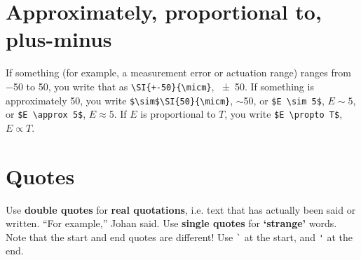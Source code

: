 \documentclass[fleqn, 12pt]{iopart-mod}
\begin{document}
\section{Approximately, proportional to, plus-minus}
If something (for example, a measurement error or actuation range) ranges from \SI{-50}{\micm} to \SI{+50}{\micm}, you write that as \verb|\SI{+-50}{\micm}|, \SI{+-50}{\micm}. If something is approximately \SI{50}{\micm}, you write \verb|$\sim$\SI{50}{\micm}|, $\sim$\SI{50}{\micm}, or \verb|$E \sim 5$|, $E \sim 5$, or \verb|$E \approx 5$|, $E \approx 5$. If $E$ is proportional to $T$, you write \verb|$E \propto T$|, $E \propto T$.

\section{Quotes}
Use \textbf{double quotes} for \textbf{real quotations}, i.e. text that has actually been said or written. ``For example,'' Johan said. 
Use \textbf{single quotes} for \textbf{`strange'} words. 
Note that the start and end quotes are different! Use \verb|`| at the start, and \verb|'| at the end.

\RaggedRight


\end{document}
